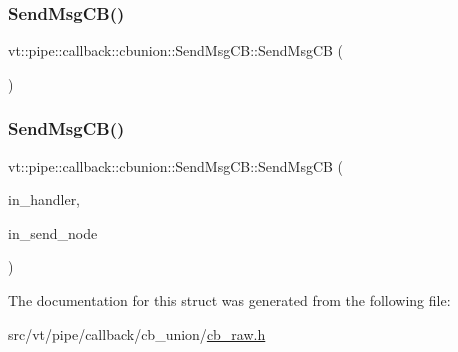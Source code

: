 \subsubsection{\texorpdfstring{Send\+Msg\+C\+B()}{SendMsgCB()}\hspace{0.1cm}{\footnotesize\ttfamily [1/2]}}
{\footnotesize\ttfamily vt\+::pipe\+::callback\+::cbunion\+::\+Send\+Msg\+C\+B\+::\+Send\+Msg\+CB (\begin{DoxyParamCaption}{ }\end{DoxyParamCaption})\hspace{0.3cm}{\ttfamily [default]}}

\mbox{\label{structvt_1_1pipe_1_1callback_1_1cbunion_1_1_send_msg_c_b_a8c24c563a6b877b011acbd95abb92fbd}} 
\subsubsection{\texorpdfstring{Send\+Msg\+C\+B()}{SendMsgCB()}\hspace{0.1cm}{\footnotesize\ttfamily [2/2]}}
{\footnotesize\ttfamily vt\+::pipe\+::callback\+::cbunion\+::\+Send\+Msg\+C\+B\+::\+Send\+Msg\+CB (\begin{DoxyParamCaption}\item[{\hyperlink{namespacevt_af64846b57dfcaf104da3ef6967917573}{Handler\+Type} const \&}]{in\+\_\+handler,  }\item[{\hyperlink{namespacevt_a866da9d0efc19c0a1ce79e9e492f47e2}{Node\+Type} const \&}]{in\+\_\+send\+\_\+node }\end{DoxyParamCaption})\hspace{0.3cm}{\ttfamily [inline]}}



The documentation for this struct was generated from the following file\+:\begin{DoxyCompactItemize}
\item 
src/vt/pipe/callback/cb\+\_\+union/\hyperlink{cb__raw_8h}{cb\+\_\+raw.\+h}\end{DoxyCompactItemize}
